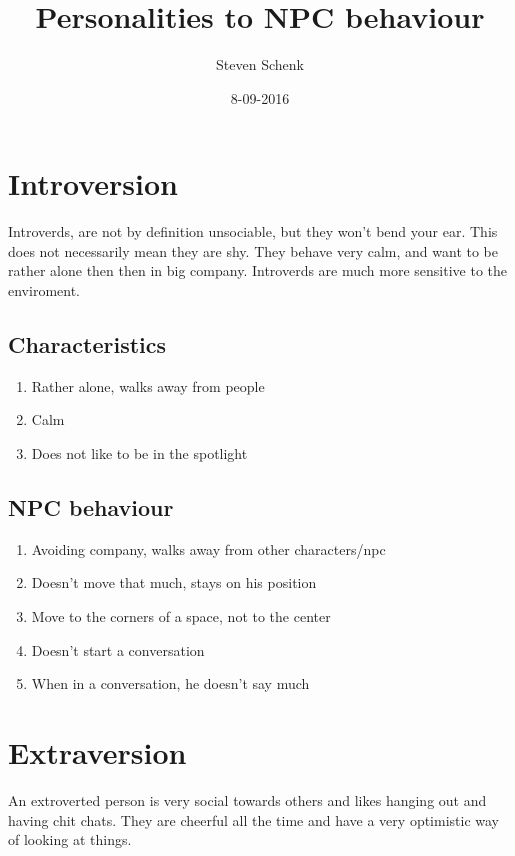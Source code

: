\documentclass{article}
\title{Personalities to NPC behaviour}
\date{8-09-2016}
\author{Steven Schenk}
\begin{document}
\maketitle
\newpage
{}
\tableofcontents

\newpage
\section{Introversion}

Introverds, are not by definition unsociable, but they won't bend your ear. This does not
necessarily mean they are shy. They behave very calm, and want to be rather alone then
then in big company. \cite{bigfive} Introverds are much more sensitive to the enviroment. \cite{introverie}

\subsection{Characteristics}
\begin{enumerate}
\item Rather alone, walks away from people 
\item Calm 
\item Does not like to be in the spotlight
\end{enumerate} 

\subsection{NPC behaviour}
\begin{enumerate}
\item Avoiding company, walks away from other characters/npc
\item Doesn't move that much, stays on his position 
\item Move to the corners of a space, not to the center
\item Doesn't start a conversation
\item When in a conversation, he doesn't say much
\end{enumerate} 

\section{Extraversion}

An extroverted person is very social towards others and likes hanging out and having chit chats.
They are cheerful all the time and have a very optimistic way of looking at things. \cite{extraversie}
\end{document}
